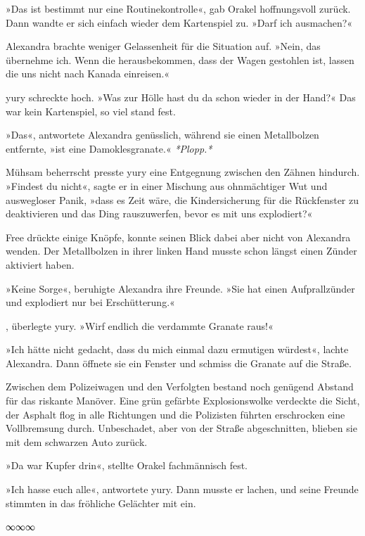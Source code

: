 »Das ist bestimmt nur eine Routinekontrolle«, gab Orakel hoffnungsvoll zurück. Dann wandte er sich einfach wieder dem Kartenspiel zu. »Darf ich ausmachen?«

Alexandra brachte weniger Gelassenheit für die Situation auf. »Nein, das übernehme ich. Wenn die herausbekommen, dass der Wagen gestohlen ist, lassen die uns nicht nach Kanada einreisen.«

yury schreckte hoch. »Was zur Hölle hast du da schon wieder in der Hand?« Das war kein Kartenspiel, so viel stand fest.

»Das«, antwortete Alexandra genüsslich, während sie einen Metallbolzen entfernte, »ist eine Damoklesgranate.« \textit{*Plopp.*}

Mühsam beherrscht presste yury eine Entgegnung zwischen den Zähnen hindurch. »Findest du nicht«, sagte er in einer Mischung aus ohnmächtiger Wut und auswegloser Panik, »dass es Zeit wäre, die Kindersicherung für die Rückfenster zu deaktivieren und das Ding rauszuwerfen, bevor es mit uns explodiert?«

Free drückte einige Knöpfe, konnte seinen Blick dabei aber nicht von Alexandra wenden. Der Metallbolzen in ihrer linken Hand musste schon längst einen Zünder aktiviert haben.

»Keine Sorge«, beruhigte Alexandra ihre Freunde. »Sie hat einen Aufprallzünder und explodiert nur bei Erschütterung.«

, überlegte yury. »Wirf endlich die verdammte Granate raus!«

»Ich hätte nicht gedacht, dass du mich einmal dazu ermutigen würdest«, lachte Alexandra. Dann öffnete sie ein Fenster und schmiss die Granate auf die Straße.

Zwischen dem Polizeiwagen und den Verfolgten bestand noch genügend Abstand für das riskante Manöver. Eine grün gefärbte Explosionswolke verdeckte die Sicht, der Asphalt flog in alle Richtungen und die Polizisten führten erschrocken eine Vollbremsung durch. Unbeschadet, aber von der Straße abgeschnitten, blieben sie mit dem schwarzen Auto zurück.

»Da war Kupfer drin«, stellte Orakel fachmännisch fest.

»Ich hasse euch alle«, antwortete yury. Dann musste er lachen, und seine Freunde stimmten in das fröhliche Gelächter mit ein.

\begin{center}
∞∞∞
\end{center}

